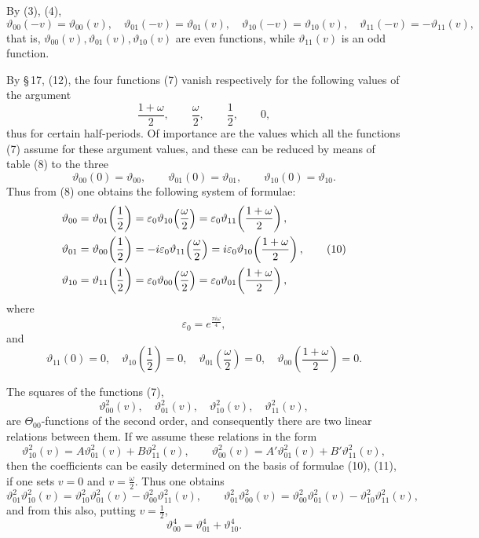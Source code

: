 \documentclass[11pt]{article}
\providecommand{\eps}{\varepsilon}
\providecommand{\eps}{\varepsilon}
\begin{document}
By (3), (4),
\begin{equation}
\vartheta_{00}(-v)=\vartheta_{00}(v),\quad
\vartheta_{01}(-v)=\vartheta_{01}(v),\quad
\vartheta_{10}(-v)=\vartheta_{10}(v),\quad
\vartheta_{11}(-v)=-\vartheta_{11}(v),
\tag{9}
\end{equation}
that is, $\vartheta_{00}(v),\vartheta_{01}(v),\vartheta_{10}(v)$ are even functions, while $\vartheta_{11}(v)$ is an odd function.

By \S\,17, (12), the four functions (7) vanish respectively for the following values of the argument
\[
\frac{1+\omega}{2},\qquad \frac{\omega}{2},\qquad \frac12,\qquad 0,
\]
thus for certain half-periods. Of importance are the values which all the functions (7) assume for these argument values, and these can be reduced by means of table (8) to the three
\[
\vartheta_{00}(0)=\vartheta_{00},\qquad
\vartheta_{01}(0)=\vartheta_{01},\qquad
\vartheta_{10}(0)=\vartheta_{10}.
\]
Thus from (8) one obtains the following system of formulae:
\begin{align}
\vartheta_{00}&=\vartheta_{01}\!\left(\frac12\right)=\eps_0\vartheta_{10}\!\left(\frac{\omega}{2}\right)=\eps_0\vartheta_{11}\!\left(\frac{1+\omega}{2}\right),\notag\\
\vartheta_{01}&=\vartheta_{00}\!\left(\frac12\right)=-i\eps_0\vartheta_{11}\!\left(\frac{\omega}{2}\right)=i\eps_0\vartheta_{10}\!\left(\frac{1+\omega}{2}\right),\tag{10}\\
\vartheta_{10}&=\vartheta_{11}\!\left(\frac12\right)=\eps_0\vartheta_{00}\!\left(\frac{\omega}{2}\right)=\eps_0\vartheta_{01}\!\left(\frac{1+\omega}{2}\right),
\notag
\end{align}
where
\[
\eps_0=e^{\frac{\pi i\omega}{4}},
\]
and
\begin{equation}
\vartheta_{11}(0)=0,\quad
\vartheta_{10}\!\left(\frac12\right)=0,\quad
\vartheta_{01}\!\left(\frac{\omega}{2}\right)=0,\quad
\vartheta_{00}\!\left(\frac{1+\omega}{2}\right)=0.
\tag{11}
\end{equation}

The squares of the functions (7),
\begin{equation}
\vartheta_{00}^2(v),\quad \vartheta_{01}^2(v),\quad
\vartheta_{10}^2(v),\quad \vartheta_{11}^2(v),
\tag{12}
\end{equation}
are $\Theta_{00}$-functions of the second order, and consequently there are two linear relations between them. If we assume these relations in the form
\[
\vartheta_{10}^2(v)=A\vartheta_{01}^2(v)+B\vartheta_{11}^2(v),\qquad
\vartheta_{00}^2(v)=A'\vartheta_{01}^2(v)+B'\vartheta_{11}^2(v),
\]
then the coefficients can be easily determined on the basis of formulae (10), (11), if one sets $v=0$ and $v=\frac{\omega}{2}$. Thus one obtains
\begin{equation}
\vartheta_{01}^2\vartheta_{10}^2(v)=\vartheta_{10}^2\vartheta_{01}^2(v)-\vartheta_{00}^2\vartheta_{11}^2(v),\qquad
\vartheta_{01}^2\vartheta_{00}^2(v)=\vartheta_{00}^2\vartheta_{01}^2(v)-\vartheta_{10}^2\vartheta_{11}^2(v),
\tag{13}
\end{equation}
and from this also, putting $v=\frac12$,
\begin{equation}
\vartheta_{00}^4=\vartheta_{01}^4+\vartheta_{10}^4.
\tag{14}
\end{equation}
\end{document}
